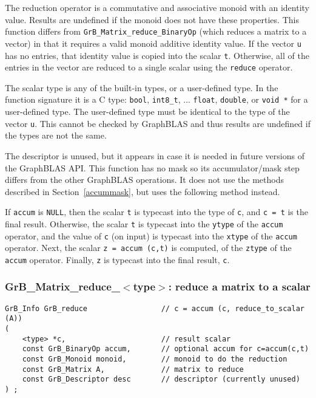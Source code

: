 \documentclass[12pt]{article}
\begin{document}
The reduction operator is a commutative and associative monoid with an identity
value.  Results are undefined if the monoid does not have these properties.
This function differs from \verb'GrB_Matrix_reduce_BinaryOp' (which reduces
a matrix to a vector) in that it requires a
valid monoid additive identity value.  If the vector \verb'u' has no entries,
that identity value is copied into the scalar \verb't'.  Otherwise, all of the
entries in the vector are reduced to a single scalar using the \verb'reduce'
operator.

The scalar type is any of the built-in types, or a user-defined type.  In the
function signature it is a C type: \verb'bool', \verb'int8_t', ...
\verb'float', \verb'double', or \verb'void *' for a user-defined type.
The user-defined type must be identical to the type of the vector \verb'u'.
This cannot be checked by GraphBLAS and thus results are undefined if the
types are not the same.

The descriptor is unused, but it appears in case it is needed in future
versions of the GraphBLAS API.
This function has no mask so its accumulator/mask step differs from the other
GraphBLAS operations.  It does not use the methods described in
Section~\ref{accummask}, but uses the following method instead.

If \verb'accum' is \verb'NULL', then the scalar \verb't' is typecast into the
type of \verb'c', and \verb'c = t' is the final result.  Otherwise, the scalar
\verb't' is typecast into the \verb'ytype' of the \verb'accum' operator, and
the value of \verb'c' (on input) is typecast into the \verb'xtype' of the
\verb'accum' operator.  Next, the scalar \verb'z = accum (c,t)' is computed, of
the \verb'ztype' of the \verb'accum' operator.  Finally, \verb'z' is typecast
into the final result, \verb'c'.

\newpage
\subsubsection{{\sf GrB\_Matrix\_reduce\_$<$type$>$:} reduce a matrix to a scalar}
\label{reduce_matrix_to_scalar}

\begin{mdframed}[userdefinedwidth=6in]
{\footnotesize
\begin{verbatim}
GrB_Info GrB_reduce                 // c = accum (c, reduce_to_scalar (A))
(
    <type> *c,                      // result scalar
    const GrB_BinaryOp accum,       // optional accum for c=accum(c,t)
    const GrB_Monoid monoid,        // monoid to do the reduction
    const GrB_Matrix A,             // matrix to reduce
    const GrB_Descriptor desc       // descriptor (currently unused)
) ;
\end{verbatim} } \end{mdframed}
\end{document}
